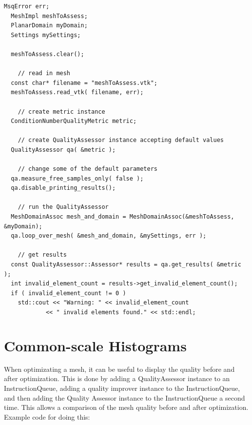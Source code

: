 \begin{lstlisting}[frame=single]
  MsqError err;
  MeshImpl meshToAssess;
  PlanarDomain myDomain;
  Settings mySettings;

  meshToAssess.clear();

    // read in mesh
  const char* filename = "meshToAssess.vtk";
  meshToAssess.read_vtk( filename, err);

    // create metric instance
  ConditionNumberQualityMetric metric;

    // create QualityAssessor instance accepting default values
  QualityAssessor qa( &metric );

    // change some of the default parameters
  qa.measure_free_samples_only( false );
  qa.disable_printing_results();

    // run the QualityAssessor
  MeshDomainAssoc mesh_and_domain = MeshDomainAssoc(&meshToAssess, &myDomain);
  qa.loop_over_mesh( &mesh_and_domain, &mySettings, err );

    // get results
  const QualityAssessor::Assessor* results = qa.get_results( &metric );
  int invalid_element_count = results->get_invalid_element_count();
  if ( invalid_element_count != 0 )
    std::cout << "Warning: " << invalid_element_count
			<< " invalid elements found." << std::endl;
\end{lstlisting}

\section{Common-scale Histograms}

When optimizating a mesh, it can be useful to display the quality before and after optimization.  This is done by adding a QualityAssessor instance to an InstructionQueue, adding a quality improver instance to the InstructionQueue, and then adding the Quality Assessor instance to the InstructionQueue a second time.  This allows a comparison of the mesh quality before and after optimization.  Example code for doing this:

